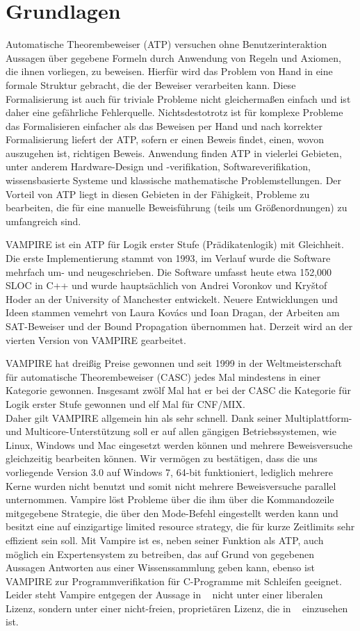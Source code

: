 \documentclass{article}
\begin{document}
\section{Grundlagen}
\label{sec:foundations}
Automatische Theorembeweiser (ATP) versuchen ohne Benutzerinteraktion Aussagen über gegebene Formeln durch Anwendung von Regeln und Axiomen, die ihnen vorliegen, zu beweisen.
Hierfür wird das Problem von Hand in eine formale Struktur gebracht, die der Beweiser verarbeiten kann.
Diese Formalisierung ist auch für triviale Probleme nicht gleichermaßen einfach und ist daher eine gefährliche Fehlerquelle. 
Nichtsdestotrotz ist für komplexe Probleme das Formalisieren einfacher als das Beweisen per Hand und nach korrekter Formalisierung liefert der ATP, 
sofern er einen Beweis findet, einen, wovon auszugehen ist, richtigen Beweis. 
Anwendung finden ATP in vielerlei Gebieten, unter anderem Hardware-Design und -verifikation, Softwareverifikation, wissensbasierte Systeme und klassische mathematische Problemstellungen.
Der Vorteil von ATP liegt in diesen Gebieten in der Fähigkeit, Probleme zu bearbeiten, 
die für eine manuelle Beweisführung (teils um Größenordnungen) zu umfangreich sind.

VAMPIRE ist ein ATP für Logik erster Stufe (Prädikatenlogik) mit Gleichheit. Die erste Implementierung stammt von 1993, im Verlauf wurde die Software mehrfach um- und neugeschrieben.
Die Software umfasst heute etwa 152,000 SLOC in C++ und wurde hauptsächlich von Andrei Voronkov und Kry{\v{s}}tof Hoder an der University of Manchester entwickelt.
Neuere Entwicklungen und Ideen stammen vemehrt von Laura Kov{\'a}cs und Ioan Dragan, der Arbeiten am SAT-Beweiser und der Bound Propagation übernommen hat.
Derzeit wird an der vierten Version von VAMPIRE gearbeitet.

VAMPIRE hat dreißig Preise gewonnen und seit 1999 in der Weltmeisterschaft für automatische Theorembeweiser (CASC) jedes Mal mindestens in einer Kategorie gewonnen.
Insgesamt zwölf Mal hat er bei der CASC die Kategorie für Logik erster Stufe gewonnen und elf Mal für CNF/MIX. ~\cite{vampirehp} \\ Daher gilt VAMPIRE allgemein hin als sehr schnell.
Dank seiner Multiplattform- und Multicore-Unterstützung soll er auf allen gängigen Betriebssystemen, wie Linux, Windows und Mac eingesetzt werden können und mehrere Beweisversuche gleichzeitig bearbeiten können.
Wir vermögen zu bestätigen, dass die uns vorliegende Version 3.0 auf Windows 7, 64-bit funktioniert, lediglich mehrere Kerne wurden nicht benutzt und somit nicht mehrere Beweisversuche parallel unternommen.
Vampire löst Probleme über die ihm über die Kommandozeile mitgegebene Strategie, die über den Mode-Befehl eingestellt werden kann und besitzt eine auf einzigartige limited resource strategy, die für kurze Zeitlimits sehr effizient sein soll. Mit Vampire ist es, neben seiner Funktion als ATP, auch möglich ein Expertensystem zu betreiben, das auf Grund von gegebenen Aussagen Antworten aus einer Wissenssammlung geben kann, ebenso ist VAMPIRE zur Programmverifikation für C-Programme mit Schleifen geeignet. 
Leider steht Vampire entgegen der Aussage in ~\cite{cav2013} nicht unter einer liberalen Lizenz, sondern unter einer nicht-freien, proprietären Lizenz, die in ~\cite{vampirehp} einzusehen ist.
\end{document}
